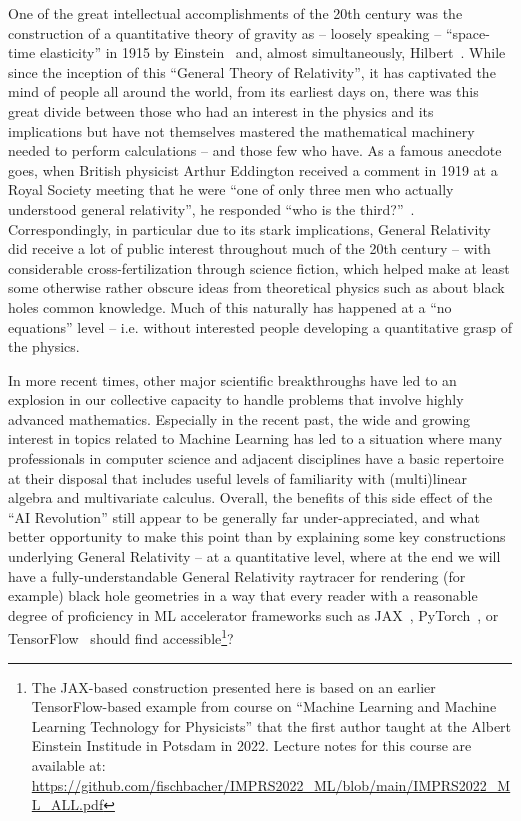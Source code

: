 \documentclass[twocolumn]{article}
\begin{document}
One of the great intellectual accomplishments of the 20th century was
the construction of a quantitative theory of gravity as -- loosely
speaking -- ``space-time elasticity'' in 1915 by
Einstein~\cite{einstein1915feldgleichungen} and, almost simultaneously,
Hilbert~\cite{hilbert1915grundlagen}. While since the inception of this
``General Theory of Relativity'', it has captivated the mind of people
all around the world, from its earliest days on, there was this great
divide between those who had an interest in the physics and its
implications but have not themselves mastered the mathematical
machinery needed to perform calculations -- and those few who have. As
a famous anecdote goes, when British physicist Arthur Eddington
received a comment in 1919 at a Royal Society meeting that he were
``one of only three men who actually understood general relativity'',
he responded ``who is the third?''~\cite{isaacson2007einstein}.
Correspondingly, in particular due
to its stark implications, General Relativity did receive a lot of
public interest throughout much of the 20th century -- with
considerable cross-fertilization through science fiction, which helped
make at least some otherwise rather obscure ideas from theoretical
physics such as about black holes common knowledge. Much of this
naturally has happened at a ``no equations'' level -- i.e. without
interested people developing a quantitative grasp of the physics.

In more recent times, other major scientific breakthroughs have led to
an explosion in our collective capacity to handle problems that
involve highly advanced mathematics. Especially in the recent past,
the wide and growing interest in topics related to Machine Learning
has led to a situation where many professionals in computer science
and adjacent disciplines have a basic repertoire at their disposal
that includes useful levels of familiarity with (multi)linear algebra
and multivariate calculus. Overall, the benefits of this side effect
of the ``AI Revolution'' still appear to be generally far
under-appreciated, and what better opportunity to make this point than
by explaining some key constructions underlying General Relativity --
at a quantitative level, where at the end we will have a
fully-understandable General Relativity raytracer for rendering (for
example) black hole geometries in a way that every reader with a
reasonable degree of proficiency in ML accelerator frameworks such as
JAX~\cite{jax2018}, PyTorch~\cite{pytorch2019}, or
TensorFlow~\cite{tensorflow2016} should find accessible\footnote{%
The JAX-based construction presented here is based on an earlier
TensorFlow-based example from course on ``Machine Learning and Machine
Learning Technology for Physicists'' that the first author taught at
the Albert Einstein Institude in Potsdam in 2022. Lecture notes
for this course are available at:
\url{https://github.com/fischbacher/IMPRS2022_ML/blob/main/IMPRS2022_ML_ALL.pdf}}?
\end{document}
